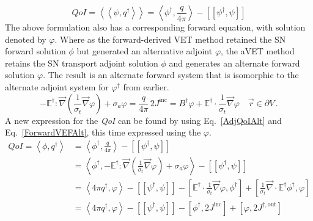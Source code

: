 \documentclass[12pt]{report}
\newcommand{\vr}{\vec{r}}
\newcommand{\bra}{\left\langle}
\newcommand{\ket}{\right\rangle}
\newcommand{\braSN}{\left\langle \! \left\langle}
\newcommand{\ketSN}{\right\rangle \! \right\rangle}
\newcommand{\sbraSN}{\left[ \! \left[}
\newcommand{\sketSN}{\right] \! \right]}
\newcommand{\sbra}{\left[}
\newcommand{\sket}{\right]}
\renewcommand{\div}{\vec{\nabla} \cdot}
\newcommand{\grad}{\vec{\nabla}}
\newcommand{\bound}{\partial V}
\newcommand{\Edd}{\mathbb{E}}
\newcommand{\BEdd}{B}
\newcommand{\sigt}{\sigma_t}
\newcommand{\siga}{\sigma_a}
\newcommand{\angSource}{\frac{q}{4 \pi}}
\newcommand{\scalResp}{q^\dag}
\newcommand{\qoi}{{\it QoI}\xspace}
\begin{document}
\begin{equation}
\label{AdjQoIAlt}
QoI = \braSN \psi , \scalResp\ketSN = \bra \phi^\dag , \angSource \ket - \sbraSN \psi^\dag,  \psi \sketSN 
\end{equation}
The above formulation also has a corresponding forward equation, with solution denoted by $\varphi$. Where as the forward-derived VET method retained the SN forward solution $\phi$ but generated an alternative adjoint $\varphi$, the aVET method retains the SN transport adjoint solution $\phi$ and generates an alternate forward solution $\varphi$. The result is an alternate forward system that is isomorphic to the alternate adjoint system for $\varphi^\dag$ from earlier.
\begin{subequations}
\begin{equation}
\label{ForwardVEFAlt}
- \Edd^\dag : \grad \left( \frac{1}{\sigt}\grad \varphi \right) + \siga \varphi  = \angSource  \,
\end{equation}
\begin{equation}
2 J^{\text{inc}}= \BEdd^\dag \varphi + \Edd^\dag \cdot \frac{1}{\sigt} \grad \varphi \quad \vr \in \bound \,.
\end{equation} 
\end{subequations}
A new expression for the \qoi can be found by using Eq.~\eqref{AdjQoIAlt} and Eq.~\eqref{ForwardVEFAlt}, this time expressed using the $\varphi$.
 \begin{equation}
\label{AdjQoIAltExpand}
\begin{split}
QoI = \bra \phi , \scalResp \ket &= \bra \phi^\dag , \angSource \ket - \sbraSN \psi^\dag,  \psi \sketSN \\
&= \bra \phi^\dag , - \Edd^\dag : \grad \left( \frac{1}{\sigt}\grad \varphi \right) + \siga \varphi \ket - \sbraSN \psi^\dag,  \psi \sketSN \\
&= \bra 4\pi \scalResp  ,\varphi \ket - \sbraSN \psi^\dag,  \psi \sketSN  
- \sbra \Edd^\dag \cdot \frac{1}{\sigt}\grad \varphi,  \phi^\dag \sket 
+ \sbra \frac{1}{\sigt} \div \Edd^\dag \phi^\dag,  \varphi \sket \\
&=  \bra 4\pi \scalResp  ,\varphi \ket - \sbraSN \psi^\dag,  \psi \sketSN - \sbra \phi^\dag, 2J^{\text{inc}} \sket + \sbra \varphi , 2 J^{\dag,\text{out}} \sket
\end{split}
\end{equation}

\end{document}
